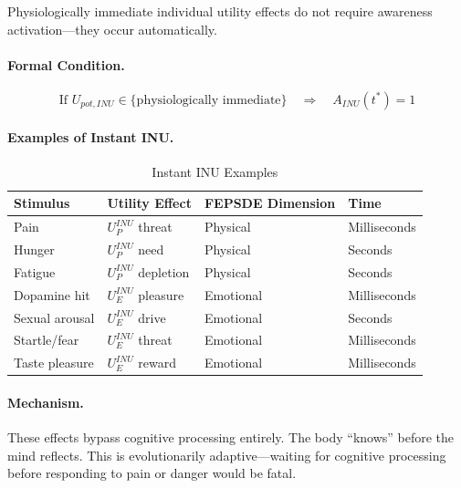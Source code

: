 \begin{axiom}
\label{ax:instant-inu}
Physiologically immediate individual utility effects do not require awareness 
activation---they occur automatically.
\end{axiom}

\paragraph{Formal Condition.}
\begin{equation}
\text{If } U_{pot,INU} \in \{\text{physiologically immediate}\} \quad \Rightarrow \quad A_{INU}(t^*) = 1
\end{equation}

\paragraph{Examples of Instant INU.}
\begin{table}[htbp]
\centering
\caption{Instant INU Examples}
\label{tab:instant-inu-examples}
\renewcommand{\arraystretch}{1.3}
\begin{tabular}{@{}llll@{}}
\toprule
\textbf{Stimulus} & \textbf{Utility Effect} & \textbf{FEPSDE Dimension} & \textbf{Time} \\
\midrule
Pain & $U^{INU}_{P}$ threat & Physical & Milliseconds \\
Hunger & $U^{INU}_{P}$ need & Physical & Seconds \\
Fatigue & $U^{INU}_{P}$ depletion & Physical & Seconds \\
Dopamine hit & $U^{INU}_{E}$ pleasure & Emotional & Milliseconds \\
Sexual arousal & $U^{INU}_{E}$ drive & Emotional & Seconds \\
Startle/fear & $U^{INU}_{E}$ threat & Emotional & Milliseconds \\
Taste pleasure & $U^{INU}_{E}$ reward & Emotional & Milliseconds \\
\bottomrule
\end{tabular}
\end{table}

\paragraph{Mechanism.}
These effects bypass cognitive processing entirely. The body ``knows''
before the mind reflects. This is evolutionarily adaptive---waiting
for cognitive processing before responding to pain or danger would be fatal.

